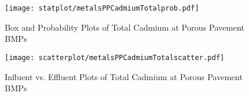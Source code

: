         \begin{figure}[hb]   %
            \centering
            \texttt{[image: statplot/metalsPPCadmiumTotalprob.pdf]}
            \caption{Box and Probability Plots of Total Cadmium at Porous Pavement BMPs}
        \end{figure}         %
        
        
        \begin{figure}[hb]   %
            \centering
            \texttt{[image: scatterplot/metalsPPCadmiumTotalscatter.pdf]}
            \caption{Influent vs. Effluent Plots of Total Cadmium at Porous Pavement BMPs}
        \end{figure}         %
        \clearpage
        